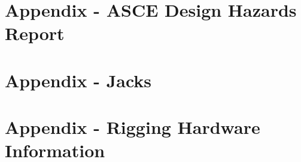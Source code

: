 \documentclass[11pt,letterpaper]{report}
\begin{document}
\setcounter{page}{1}
\renewcommand{\thepage}{\Alph{section}-\arabic{page}}
\section{Appendix  - ASCE Design Hazards Report}


\setcounter{page}{1}
\renewcommand{\thepage}{\Alph{section}-\arabic{page}}
\section{Appendix  - Jacks}
 

\setcounter{page}{1}
\renewcommand{\thepage}{\Alph{section}-\arabic{page}}
\section{Appendix  - Rigging Hardware Information}
\end{document}
